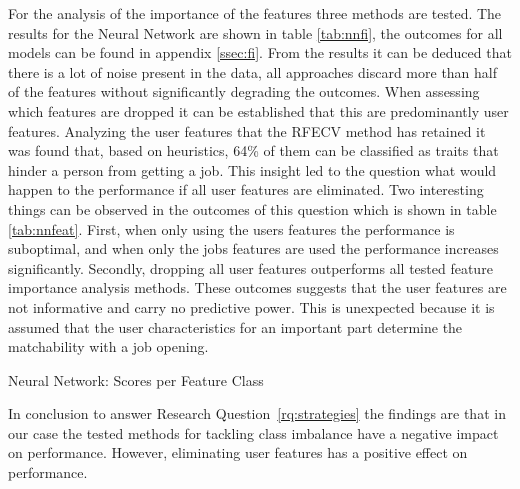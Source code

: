For the analysis of the importance of the features three methods are tested. 
The results for the Neural Network are shown in table \ref{tab:nnfi}, the outcomes for all models can be found in appendix \ref{ssec:fi}.
From the results it can be deduced that there is a lot of noise present in the data, all approaches discard more than half of the features without significantly degrading the outcomes.
When assessing which features are dropped it can be established that this are predominantly user features.
Analyzing the user features that the RFECV method has retained it was found that, based on heuristics, 64\% of them can be classified as traits that hinder a person from getting a job.
This insight led to the question what would happen to the performance if all user features are eliminated.
Two interesting things can be observed in the outcomes of this question which is shown in table \ref{tab:nnfeat}.
First, when only using the users features the performance is suboptimal, and when only the jobs features are used the performance increases significantly.
Secondly, dropping all user features outperforms all tested feature importance analysis methods.
These outcomes suggests that the user features are not informative and carry no predictive power.
This is unexpected because it is assumed that the user characteristics for an important part determine the matchability with a job opening.

\begin{table}[h]
\begin{footnotesize}

\end{footnotesize}
\caption{\label{tab:nnfeat} \footnotesize{Neural Network: Scores per Feature Class}}
\end{table}

In conclusion to answer Research Question~\ref{rq:strategies} the findings are that in our case the tested methods for tackling class imbalance have a negative impact on performance.
However, eliminating user features has a positive effect on performance.

